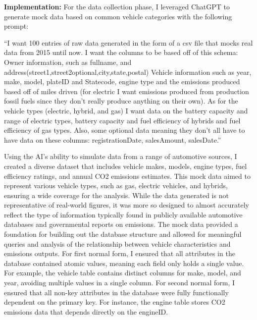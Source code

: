 \documentclass[12pt,letterpaper]{article}
\begin{document}
	\textbf{Implementation:}
	For the data collection phase, I leveraged ChatGPT to generate mock data based on common vehicle categories with the following prompt:
	\begin{displayquote}
		“I want 100 entries of raw data generated in the form of a csv file that mocks real data from 2015 until now. I want the columns to be based off of this schema: Owner information, such as fullname, and address(street1,street2optional,city,state,postal) Vehicle information such as year, make, model, plateID and Statecode, engine type and the emissions produced based off of miles driven (for electric I want emissions produced from production fossil fuels since they don't really produce anything on their own). As for the vehicle types (electric, hybrid, and gas) I want data on the battery capacity and range of electric types, battery capacity and fuel efficiency of hybrids and fuel efficiency of gas types. Also, some optional data meaning they don't all have to have data on these columns: registrationDate, salesAmount, salesDate.” 
	\end{displayquote}
	Using the AI’s ability to simulate data from a range of automotive sources, I created a diverse dataset that includes vehicle makes, models, engine types, fuel efficiency ratings, and annual CO2 emissions estimates. This mock data aimed to represent various vehicle types, such as gas, electric vehicles, and hybrids, ensuring a wide coverage for the analysis. While the data generated is not representative of real-world figures, it was more so designed to almost accurately reflect the type of information typically found in publicly available automotive databases and governmental reports on emissions. The mock data provided a foundation for building out the database structure and allowed for meaningful queries and analysis of the relationship between vehicle characteristics and emissions outputs. For first normal form, I ensured that all attributes in the database contained atomic values, meaning each field only holds a single value. For example, the vehicle table contains distinct columns for make, model, and year, avoiding multiple values in a single column. For second normal form, I ensured that all non-key attributes in the database were fully functionally dependent on the primary key. For instance, the engine table stores CO2 emissions data that depends directly on the engineID.
	
\end{document}
